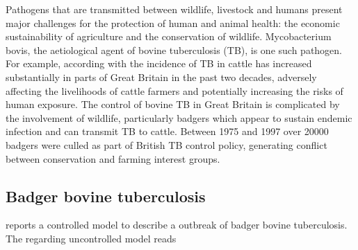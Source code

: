 Pathogens that are transmitted between wildlife, livestock and humans present
major challenges for the protection of human and animal health: the economic
sustainability of agriculture and the conservation of wildlife. Mycobacterium
bovis, the aetiological agent of bovine tuberculosis (TB), is one such pathogen.
For example, according with \citet{Donnelly2003} the incidence of TB in cattle 
has increased substantially in parts of Great Britain in the past two decades, 
adversely affecting the livelihoods of cattle farmers and potentially 
increasing the risks of human exposure. The control of bovine TB in Great 
Britain is complicated by the involvement of wildlife, particularly badgers 
which appear to sustain endemic infection and can transmit TB to cattle. 
Between \num{1975} and \num{1997} over \num{20000} badgers were
culled as part of British TB control policy, generating conflict between
conservation and farming interest groups.

\subsection*{Badger bovine tuberculosis}
\citet{Bolzoni2014} reports a controlled model to describe a outbreak of badger 
bovine tuberculosis. The regarding uncontrolled model reads


